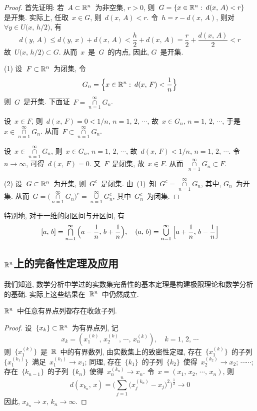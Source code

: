 \begin{proof}
首先证明: 若~$A \subset \mathbb{R}^n$~为非空集, $r > 0$, 则~$G = \{x \in \mathbb{R}^n: \: d(x,\,A) < r\}$~ 是开集. 实际上, 任取~$x \in G$, 则~$d(x,\,A) < r$. 令~$h = r - d(x,\,A)$, 则对~$\forall y \in U\big(x,\,h/2\big)$, 有
\[
d(y,\,A) \leqslant d(y,\,x) + d(x,\,A) < \frac{h}{2} + d(x,\,A) = \frac{r}{2} + \frac{d(x,\,A)}{2} < r
\]
故~$U\big(x,\,h/2\big) \subset G$. 从而~$x$~是~$G$~的内点, 因此, $G$~是开集.

(1) 设~$F \subset \mathbb{R}^n$~为闭集, 令
\[
G_n = \Big\{x \in \mathbb{R}^n:\: d(x,\,F) < \frac{1}{n} \Big\}
\]
则~$G$~是开集. 下面证~$F = \mathop{\cap}\limits_{n=1}^\infty G_n$.

设~$x \in F$, 则~$d(x,\,F) = 0 < 1/n, \, n = 1, \, 2, \, \cdots$, 故~$x \in G_n, \, n = 1, \, 2, \, \cdots$, 于是~$x \in \mathop{\cap}\limits_{n=1}^\infty G_n$. 从而~$F \subset \mathop{\cap}\limits_{n=1}^\infty G_n$.

设~$x \in \mathop{\cap}\limits_{n=1}^\infty G_n$, 则~$x \in G_n, \, n = 1, \, 2, \, \cdots$, 故~$d(x,\,F) < 1/n, \, n = 1, \, 2, \, \cdots$. 令~$n \rightarrow \infty$, 可得~$d(x,\,F) = 0$. 又~$F$~是闭集, 故~$x \in F$. 从而~$\mathop{\cap}\limits_{n=1}^\infty G_n \subset F$.

(2) 设~$G \subset \mathbb{R}^n$~为开集, 则~$G^c$~是闭集. 由~(1)~知~$G^c = \mathop{\cap}\limits_{n=1}^\infty G_n$, 其中, $G_n$~为开集. 从而~$G = \big(\mathop{\cap}\limits_{n=1}^\infty G_n\big)^c = \mathop{\cup}\limits_{n=1}^\infty G_n^c$, 其中~$G_n^c$~为闭集.
\end{proof}

特别地, 对于一维的闭区间与开区间, 有
\[
[a,\,b] = \mathop{\textstyle{\bigcap}}_{n=1}^\infty \Big(a - \frac{1}{n},\,b + \frac{1}{n}\Big), \quad (a,\,b) = \mathop{\textstyle{\bigcup}}_{n=1}^\infty \Big[a + \frac{1}{n},\,b - \frac{1}{n}\Big]
\]

\subsection{$\mathbb{R}^n$上的完备性定理及应用}

我们知道, 数学分析中学过的实数集完备性的基本定理是构建极限理论和数学分析的基础.
实际上这些结果在~$\mathbb{R}^n$~中仍然成立.

\begin{theorem}
$\mathbb{R}^n$~中任意有界点列都存在收敛子列.
\end{theorem}

\begin{proof}
设~$\{x_k\} \subset \mathbb{R}^n$~为有界点列, 记
\[
x_k = (x_1 ^{(k)},\, x_2 ^{(k)},\, \cdots, \, x_n ^{(k)}), \quad k = 1, \, 2, \, \cdots
\]
则~$\{x_1 ^{(k)}\}$~是~$\mathbb{R}$~中的有界数列, 由实数集上的致密性定理, 存在~$\{x_1 ^{(k)}\}$~的子列~$\{x_1 ^{(k_1)}\}$~满足~$x_1 ^{(k_1)} \rightarrow x_1$; 同理, 存在~$\{k_1\}$~的子列~$\{k_2\}$~使得~$x_2 ^{(k_2)} \rightarrow x_2$; $\cdots\cdots$; 存在~$\{k_{n-1}\}$~的子列~$\{k_n\}$~使得~$x_n ^{(k_n)} \rightarrow x_n$. 令~$x = (x_1,\,x_2,\, \cdots,\,x_n)$, 则
\[
d(x_{k_n},\,x) =\Big( \sum_{j=1}^n \big(x_j ^{(k_n)} - x_j \big)^2 \Big) ^\frac{1}{2} \rightarrow 0
\]
因此, $x_{k_n} \rightarrow x, \, k_n \rightarrow \infty$.
\end{proof}

